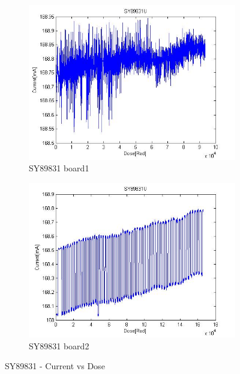 \documentclass[12pt]{article}
\numberwithin{figure}{section}
\begin{document}
\begin{figure}[!htbp]
\centering
  \begin{subfigure}{.49\textwidth}
  \centering
  \includegraphics[width=\linewidth]{current_sy.jpg}
  \caption{SY89831 board1}
  \label{SY89831_1}
  \end{subfigure}
  \begin{subfigure}{.49\textwidth}
  \centering
  \includegraphics[width=\linewidth]{current_dose_SY2.jpg}
  \caption{SY89831 board2}
  \label{SY89831_2}
  \end{subfigure}
 \caption{SY89831 - Current vs Dose}
\end{figure}

\FloatBarrier
\end{document}
